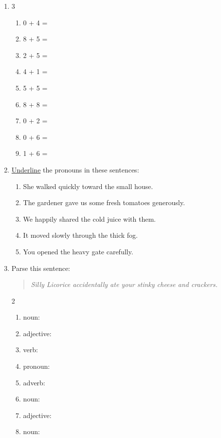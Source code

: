 \documentclass{tufte-book}
\begin{document}
\begin{enumerate}
  \item
  \begin{multicols}{3}
    \begin{enumerate}\bigskip
      \item 0 + 4 = \dotfill\bigskip
      \item 8 + 5 = \dotfill\bigskip
      \item 2 + 5 = \dotfill
      \item 4 + 1 = \dotfill\bigskip
      \item 5 + 5 = \dotfill\bigskip
      \item 8 + 8 = \dotfill
      \item 0 + 2 = \dotfill\bigskip
      \item 0 + 6 = \dotfill\bigskip
      \item 1 + 6 = \dotfill
    \end{enumerate}
  \end{multicols}

  \item \underline{Underline} the pronouns in these sentences:
  \begin{enumerate}
    \item She walked quickly toward the small house.
    \item The gardener gave us some fresh tomatoes generously.
    \item We happily shared the cold juice with them.
    \item It moved slowly through the thick fog.
    \item You opened the heavy gate carefully.
    \end{enumerate}
  
  \item Parse this sentence:
  \begin{quote}
    \textit{Silly Licorice accidentally ate your stinky cheese and crackers.}
  \end{quote}
  \begin{multicols}{2}
  \begin{enumerate}\bigskip
    \item noun: \dotfill\bigskip
    \item adjective: \dotfill\bigskip
    \item verb: \dotfill\bigskip
    \item pronoun: \dotfill
    \item adverb: \dotfill\bigskip
    \item noun: \dotfill\bigskip
    \item adjective: \dotfill\bigskip
    \item noun: \dotfill
  \end{enumerate}
  \end{multicols}


\end{enumerate}
\end{document}
